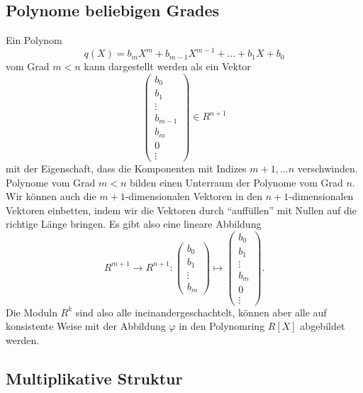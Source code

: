 \subsection{Polynome beliebigen Grades
\label{buch:subsection:polynome:beliebigergrad}}
Ein Polynom
\[
q(X)
=
b_mX^m + b_{m-1}X^{m-1} + \dots + b_1X + b_0
\]
vom Grad $m<n$ kann dargestellt werden als ein Vektor
\[
\begin{pmatrix}
b_0\\
b_1\\
\vdots\\
b_{m-1}\\
b_{m}\\
0\\
\vdots
\end{pmatrix}
\in
R^{n+1}
\]
mit der Eigenschaft, dass die Komponenten mit Indizes
$m+1,\dots n$ verschwinden.
Polynome vom Grad $m<n$ bilden einen Unterraum der Polynome vom Grad $n$.
Wir können auch die $m+1$-dimensionalen Vektoren in den $n+1$-dimensionalen
Vektoren einbetten, indem wir die Vektoren durch ``auffüllen'' mit Nullen
auf die richtige Länge bringen.
Es gibt also eine lineare Abbildung
\[
R^{m+1} \to R^{n+1}
\colon
\begin{pmatrix}
b_0\\b_1\\\vdots\\b_m
\end{pmatrix}
\mapsto
\begin{pmatrix}
b_0\\b_1\\\vdots\\b_m\\0\\\vdots
\end{pmatrix}
.
\]
Die Moduln $R^{k}$ sind also alle ineinandergeschachtelt, können aber 
alle auf konsistente Weise mit der Abbildung $\varphi$ in den Polynomring
$R[X]$ abgebildet werden.
\begin{center}
\end{center}
\subsection{Multiplikative Struktur
\label{buch:subsection:polynome:multiplikativestruktur}}






